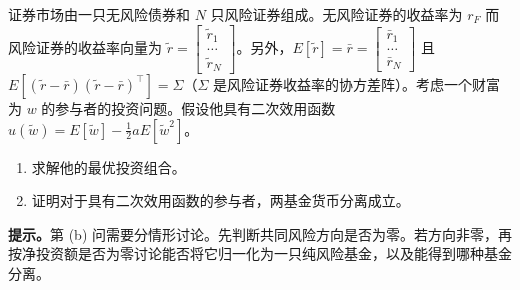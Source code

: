 \begin{samepage}
\begin{problem}
 证券市场由一只无风险债券和 $N$ 只风险证券组成。无风险证券的收益率为 $r_{F}$ 而风险证券的收益率向量为 $\tilde{r}=\begin{bmatrix}\tilde{r}_{1} \\ \ldots \\ \tilde{r}_{N}\end{bmatrix}$。另外，$E[\tilde{r}]=\bar{r}=\begin{bmatrix}\bar{r}_{1} \\ \ldots \\ \bar{r}_{N}\end{bmatrix}$ 且 $E[(\tilde{r}-\bar{r})(\tilde{r}-\bar{r})^{\top}]=\Sigma$（$\Sigma$ 是风险证券收益率的协方差阵）。考虑一个财富为 $w$ 的参与者的投资问题。假设他具有二次效用函数 $u(\tilde{w})=E[\tilde{w}]-\tfrac12 a E[\tilde{w}^{2}]$。
\begin{enumerate}[label=(\alph*)]
    \item 求解他的最优投资组合。
    \item 证明对于具有二次效用函数的参与者，两基金货币分离成立。
\end{enumerate}
\par\smallskip
\textbf{提示。}第 (b) 问需要分情形讨论。先判断共同风险方向是否为零。若方向非零，再按净投资额是否为零讨论能否将它归一化为一只纯风险基金，以及能得到哪种基金分离。
\end{problem}
\end{samepage}
